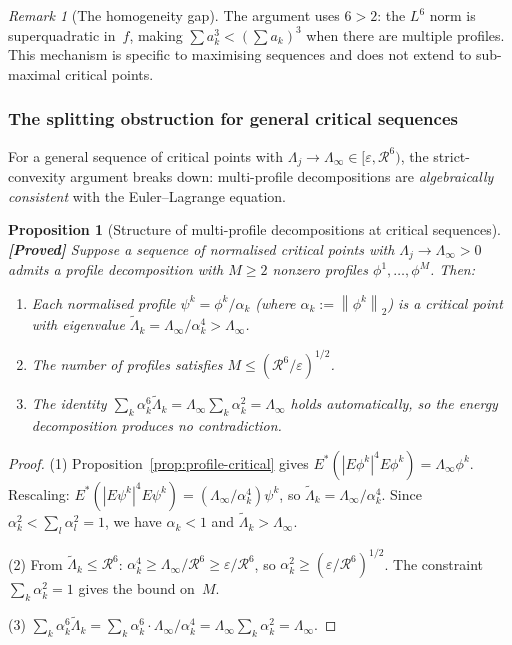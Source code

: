 \documentclass[12pt]{article}
\newtheorem{proposition}[theorem]{Proposition}
\theoremstyle{definition}
\theoremstyle{remark}
\newtheorem{remark}[theorem]{Remark}
\newcommand{\norm}[1]{\left\|#1\right\|}
\newcommand{\proven}{\textbf{\color{teal}[Proved]}}
\begin{document}
\begin{remark}[The homogeneity gap]
  The argument uses $6>2$: the $L^6$ norm is superquadratic in~$f$,
  making $\sum a_k^3<(\sum a_k)^3$ when there are multiple profiles.
  This mechanism is specific to maximising sequences and does not
  extend to sub-maximal critical points.
\end{remark}

\subsubsection{The splitting obstruction for general critical sequences}

For a general sequence of critical points with
$\Lambda_j\to\Lambda_\infty\in[\varepsilon,\mathcal R^6)$, the
strict-convexity argument breaks down: multi-profile decompositions
are \emph{algebraically consistent} with the Euler--Lagrange equation.

\begin{proposition}[Structure of multi-profile decompositions at
  critical sequences]
  \label{prop:multi-profile}
  \proven\quad
  Suppose a sequence of normalised critical points with
  $\Lambda_j\to\Lambda_\infty>0$ admits a profile decomposition
  with $M\geq 2$ nonzero profiles $\phi^1,\ldots,\phi^M$.  Then:
  \begin{enumerate}[leftmargin=2em]
    \item Each normalised profile $\psi^k=\phi^k/\alpha_k$ (where
      $\alpha_k:=\norm{\phi^k}_2$) is a critical point with
      eigenvalue
      $\widetilde\Lambda_k=\Lambda_\infty/\alpha_k^4
      >\Lambda_\infty$.
    \item The number of profiles satisfies
      $M\leq(\mathcal R^6/\varepsilon)^{1/2}$.
    \item The identity $\sum_k\alpha_k^6\widetilde\Lambda_k
      =\Lambda_\infty\sum_k\alpha_k^2=\Lambda_\infty$ holds
      automatically, so the energy decomposition produces no
      contradiction.
  \end{enumerate}
\end{proposition}

\begin{proof}
  (1) Proposition~\ref{prop:profile-critical} gives
  $E^*(|E\phi^k|^4E\phi^k)=\Lambda_\infty\phi^k$.  Rescaling:
  $E^*(|E\psi^k|^4E\psi^k)=(\Lambda_\infty/\alpha_k^4)\psi^k$,
  so $\widetilde\Lambda_k=\Lambda_\infty/\alpha_k^4$.  Since
  $\alpha_k^2<\sum_l\alpha_l^2=1$, we have $\alpha_k<1$ and
  $\widetilde\Lambda_k>\Lambda_\infty$.

  (2) From $\widetilde\Lambda_k\leq\mathcal R^6$:
  $\alpha_k^4\geq\Lambda_\infty/\mathcal R^6
  \geq\varepsilon/\mathcal R^6$, so
  $\alpha_k^2\geq(\varepsilon/\mathcal R^6)^{1/2}$.  The constraint
  $\sum_k\alpha_k^2=1$ gives the bound on~$M$.

  (3) $\sum_k\alpha_k^6\widetilde\Lambda_k
  =\sum_k\alpha_k^6\cdot\Lambda_\infty/\alpha_k^4
  =\Lambda_\infty\sum_k\alpha_k^2=\Lambda_\infty$. \qedhere
\end{proof}
\end{document}
